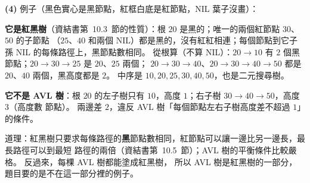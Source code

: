 \begin{pastsoln}
\textbf{(4)} 例子（黑色實心是黑節點，紅框白底是紅節點，NIL 葉子沒畫）：
\begin{center}
\end{center}
\textbf{它是紅黑樹}（資結書第~10.3~節的性質）：根 $20$ 是黑的；唯一的兩個紅節點 $30$、$50$ 的子節點
（$25$、$40$ 和兩個 NIL）都是黑的，沒有紅紅相連；每個節點到它子孫 NIL 的每條路徑上，黑節點數相同。
從根算（不算 NIL）：$20 \to 10$ 有 $2$ 個黑節點；$20 \to 30 \to 25$ 是 $20$、$25$ 兩個；
$20 \to 30 \to 40$、$20 \to 30 \to 40 \to 50$ 都是 $20$、$40$ 兩個，黑高度都是 $2$。 中序是
$10, 20, 25, 30, 40, 50$，也是二元搜尋樹。

\textbf{它不是 AVL 樹}：根 $20$ 的左子樹只有 $10$，高度 $1$；右子樹 $30 \to 40 \to 50$，高度 $3$（高度數
節點）。 兩邊差 $2$，違反 AVL 樹「每個節點左右子樹高度差不超過 $1$」的條件。

道理：紅黑樹只要求每條路徑的\textbf{黑}節點數相同，紅節點可以讓一邊比另一邊長，最長路徑可以到最短
路徑的兩倍（資結書第~10.5~節）；AVL 樹的平衡條件比較嚴格。 反過來，每棵 AVL 樹都能塗成紅黑樹，
所以 AVL 樹是紅黑樹的一部分，題目要的是不在這一部分裡的例子。
\end{pastsoln}
